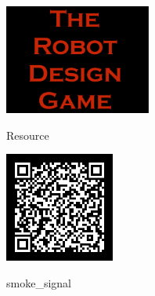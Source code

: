 \documentclass[11pt]{article}
\begin{document}
\color{white}            
    
    \begin{center}
        \vfill
        \vfill
        \vfill

        \includegraphics[height=3.6cm]{rdg_logo}%
        
        \vfill

        

Resource



        \includegraphics[height=3.6cm]{smoke_signal-qr}%

        smoke\_signal

        \vfill
    \end{center}
\end{document}
